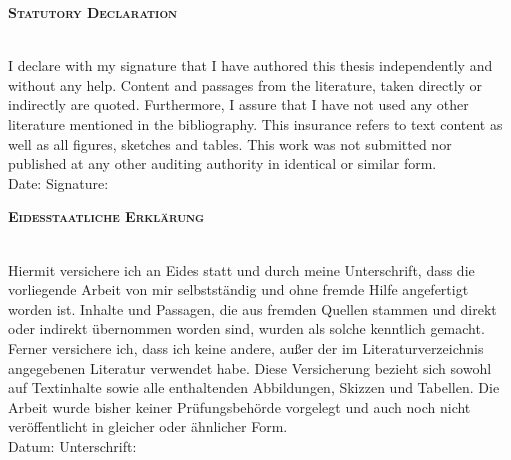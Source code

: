 
\begin{center}
\large \textsc{\textbf{Statutory Declaration}} \\
~\\ %



\end{center}

I declare with my signature that I have authored this thesis independently and without any help. Content and passages from the literature, taken directly or indirectly are quoted. Furthermore, I assure that I have not used any other literature mentioned in the bibliography. This insurance refers to text content as well as all figures, sketches and tables. This work was not submitted nor published at any other auditing authority in identical or similar form.
\\[1.5cm]
Date:	\hrulefill\enspace Signature: \hrulefill
\\[3.5cm]


\begin{center}
\large \textsc{ \textbf{Eidesstaatliche Erkl\"arung} } \\
~\\ %
\end{center}

Hiermit versichere ich an Eides statt und durch meine Unterschrift, dass die vorliegende Arbeit von mir selbstständig und ohne fremde Hilfe angefertigt worden ist. Inhalte und Passagen, die aus fremden Quellen stammen und direkt oder indirekt übernommen worden sind, wurden als solche kenntlich gemacht. Ferner versichere ich, dass ich keine andere, außer der im Literaturverzeichnis angegebenen Literatur verwendet habe. Diese Versicherung bezieht sich sowohl auf Textinhalte sowie alle enthaltenden Abbildungen, Skizzen und Tabellen. Die Arbeit wurde bisher keiner Prüfungsbehörde vorgelegt und auch noch nicht veröffentlicht in gleicher oder ähnlicher Form. 
\\[1.5cm]
Datum:	\hrulefill\enspace Unterschrift: \hrulefill
\\[3.5cm]